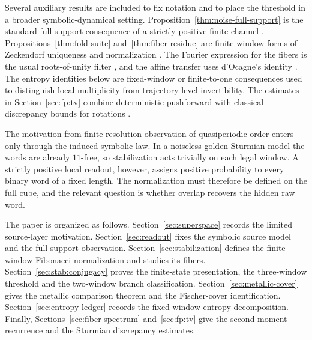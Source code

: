 Several auxiliary results are included to fix notation and to place the threshold in a broader symbolic-dynamical setting. Proposition~\ref{thm:noise-full-support} is the standard full-support consequence of a strictly positive finite channel \cite{CoverThomas2006}. Propositions~\ref{thm:fold-suite} and~\ref{thm:fiber-residue} are finite-window forms of Zeckendorf uniqueness and normalization \cite{Zeckendorf1972,Lothaire2002,Frougny1992,Berstel2001}. The Fourier expression for the fibers is the usual roots-of-unity filter \cite{Stanley2012}, and the affine transfer uses d'Ocagne's identity \cite{Koshy2001}. The entropy identities below are fixed-window or finite-to-one consequences used to distinguish local multiplicity from trajectory-level invertibility. The estimates in Section~\ref{sec:fp:tv} combine deterministic pushforward with classical discrepancy bounds for rotations \cite{KuipersNiederreiter1974,DrmotaTichy1997}.

The motivation from finite-resolution observation of quasiperiodic order \cite{Shechtman1984,Jagannathan2021,BaakeGrimm2013} enters only through the induced symbolic law. In a noiseless golden Sturmian model the words are already $11$-free, so stabilization acts trivially on each legal window. A strictly positive local readout, however, assigns positive probability to every binary word of a fixed length. The normalization must therefore be defined on the full cube, and the relevant question is whether overlap recovers the hidden raw word.

The paper is organized as follows. Section~\ref{sec:superspace} records the limited source-layer motivation. Section~\ref{sec:readout} fixes the symbolic source model and the full-support observation. Section~\ref{sec:stabilization} defines the finite-window Fibonacci normalization and studies its fibers. Section~\ref{sec:stab:conjugacy} proves the finite-state presentation, the three-window threshold and the two-window branch classification. Section~\ref{sec:metallic-cover} gives the metallic comparison theorem and the Fischer-cover identification. Section~\ref{sec:entropy-ledger} records the fixed-window entropy decomposition. Finally, Sections~\ref{sec:fiber-spectrum} and~\ref{sec:fp:tv} give the second-moment recurrence and the Sturmian discrepancy estimates.
